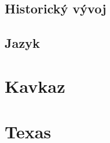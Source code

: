 \hypertarget{historickuxfd-vuxfdvoj-1}{%
\subsection*{Historický vývoj}\label{historickuxfd-vuxfdvoj-1}}

\hypertarget{jazyk-1}{%
\subsection*{Jazyk}\label{jazyk-1}}

\hypertarget{kavkaz}{%
\section{Kavkaz}\label{kavkaz}}

\hypertarget{texas}{%
\section{Texas}\label{texas}}
